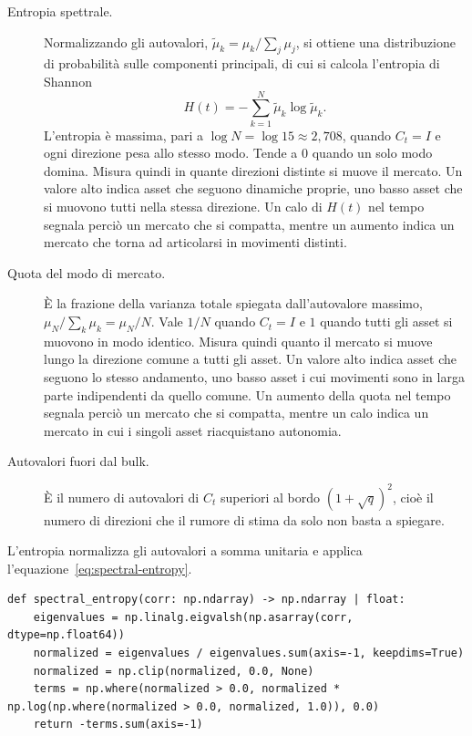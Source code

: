 \begin{description}
    \item[Entropia spettrale.] Normalizzando gli autovalori, $\tilde\mu_k=\mu_k/\sum_j\mu_j$, si ottiene una distribuzione di probabilità sulle componenti principali, di cui si calcola l'entropia di Shannon
    \begin{equation}
    \label{eq:spectral-entropy}
    H(t) = -\sum_{k=1}^{N}\tilde\mu_k\log\tilde\mu_k.
    \end{equation}
    L'entropia è massima, pari a $\log N=\log 15\approx2{,}708$, quando $C_t=I$ e ogni direzione pesa allo stesso modo. Tende a $0$ quando un solo modo domina. Misura quindi in quante direzioni distinte si muove il mercato. Un valore alto indica asset che seguono dinamiche proprie, uno basso asset che si muovono tutti nella stessa direzione. Un calo di $H(t)$ nel tempo segnala perciò un mercato che si compatta, mentre un aumento indica un mercato che torna ad articolarsi in movimenti distinti.
    \item[Quota del modo di mercato.] È la frazione della varianza totale spiegata dall'autovalore massimo, $\mu_N/\sum_k\mu_k=\mu_N/N$. Vale $1/N$ quando $C_t=I$ e $1$ quando tutti gli asset si muovono in modo identico. Misura quindi quanto il mercato si muove lungo la direzione comune a tutti gli asset. Un valore alto indica asset che seguono lo stesso andamento, uno basso asset i cui movimenti sono in larga parte indipendenti da quello comune. Un aumento della quota nel tempo segnala perciò un mercato che si compatta, mentre un calo indica un mercato in cui i singoli asset riacquistano autonomia.
    \item[Autovalori fuori dal bulk.] È il numero di autovalori di $C_t$ superiori al bordo $(1+\sqrt q)^2$, cioè il numero di direzioni che il rumore di stima da solo non basta a spiegare.
\end{description}

L'entropia normalizza gli autovalori a somma unitaria e applica l'equazione~\eqref{eq:spectral-entropy}.

\begin{listing}[H]
\begin{verbatim}
def spectral_entropy(corr: np.ndarray) -> np.ndarray | float:
    eigenvalues = np.linalg.eigvalsh(np.asarray(corr, dtype=np.float64))
    normalized = eigenvalues / eigenvalues.sum(axis=-1, keepdims=True)
    normalized = np.clip(normalized, 0.0, None)
    terms = np.where(normalized > 0.0, normalized * np.log(np.where(normalized > 0.0, normalized, 1.0)), 0.0)
    return -terms.sum(axis=-1)
\end{verbatim}
\caption{\texttt{spectral\_entropy}}
\label{lst:spectral-entropy}
\end{listing}

